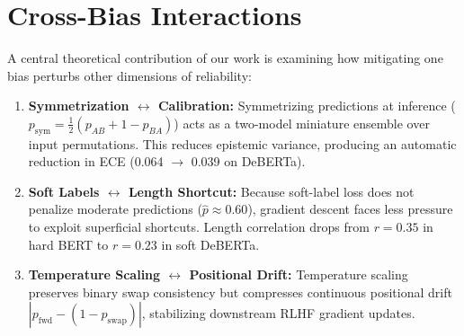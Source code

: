 \documentclass[12pt,a4paper]{article}
\newcommand{\sym}{\text{sym}}
\begin{document}
\begin{figure}[H]
\centering
{}
\end{figure}

\section{Cross-Bias Interactions}

A central theoretical contribution of our work is examining how mitigating one bias perturbs other dimensions of reliability:
\begin{enumerate}
    \item \textbf{Symmetrization $\longleftrightarrow$ Calibration:} Symmetrizing predictions at inference ($p_{\sym} = \frac{1}{2}(p_{AB} + 1 - p_{BA})$) acts as a two-model miniature ensemble over input permutations. This reduces epistemic variance, producing an automatic reduction in ECE (0.064 $\to$ 0.039 on DeBERTa).
    \item \textbf{Soft Labels $\longleftrightarrow$ Length Shortcut:} Because soft-label loss does not penalize moderate predictions ($\hat{p} \approx 0.60$), gradient descent faces less pressure to exploit superficial shortcuts. Length correlation drops from $r = 0.35$ in hard BERT to $r = 0.23$ in soft DeBERTa.
    \item \textbf{Temperature Scaling $\longleftrightarrow$ Positional Drift:} Temperature scaling preserves binary swap consistency but compresses continuous positional drift $|p_{\text{fwd}} - (1 - p_{\text{swap}})|$, stabilizing downstream RLHF gradient updates.
\end{enumerate}
\end{document}
